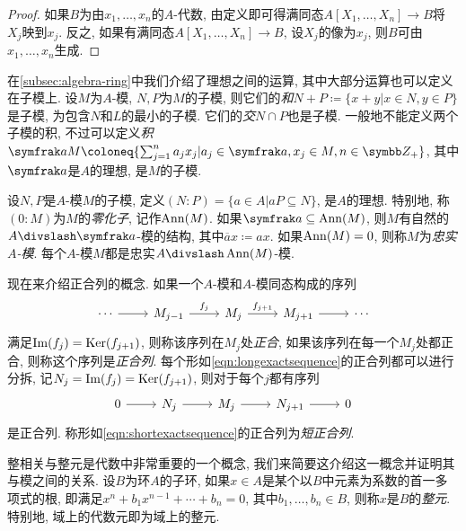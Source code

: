\begin{proof}
  如果$B$为由$x_1, \dotsc, x_n$的$A$-代数, 由定义即可得满同态$A[X_1, \dotsc, X_n]\to B$将$X_j$映到$x_j$. 反之, 如果有满同态$A[X_1, \dotsc, X_n]\to B$, 设$X_j$的像为$x_j$, 则$B$可由$x_1, \dotsc, x_n$生成.
\end{proof}

在\ref{subsec:algebra-ring}中我们介绍了理想之间的运算, 其中大部分运算也可以定义在子模上. 设$M$为$A$-模, $N, P$为$M$的子模, 则它们的\emph{和}$N+P\coloneq \{x+y\vert x\in N, y\in P\}$是子模, 为包含$N$和$L$的最小的子模. 它们的\emph{交}$N\cap P$也是子模. 一般地不能定义两个子模的积, 不过可以定义\emph{积}$\ideal{a}M\coloneq \{\sum_{j=1}^n a_jx_j\vert a_j\in\ideal{a}, x_j\in M, n\in\ZZ_+\}$, 其中$\ideal{a}$是$A$的理想, 是$M$的子模.

设$N, P$是$A$-模$M$的子模, 定义$(N{:}P)=\{a\in A\vert aP\subseteq N\}$, 是$A$的理想. 特别地, 称$(0{:}M)$为$M$的\emph{零化子}, 记作$\operatorname{Ann} (M)$. 如果$\ideal{a}\subseteq \Ann (M)$, 则$M$有自然的$A{\divslash}\ideal{a}$-模的结构, 其中$\overline{a}x\coloneq ax$. 如果$\operatorname{Ann} (M)=0$, 则称$M$为\emph{忠实$A$-模}. 每个$A$-模$M$都是忠实$A{\divslash}\Ann (M)$-模.

现在来介绍正合列的概念. 如果一个$A$-模和$A$-模同态构成的序列
\begin{equation}
  \begin{tikzcd}
    \dotsb \arrow[r] & M_{j-1} \arrow[r, "f_j"] & M_j \arrow[r, "f_{j+1}"] & M_{j+1} \arrow[r] & \dotsb\label{eqn:longexactsequence}
  \end{tikzcd}
\end{equation}
满足$\operatorname{Im} (f_j)=\operatorname{Ker} (f_{j+1})$, 则称该序列在$M_j$处\emph{正合}, 如果该序列在每一个$M_j$处都正合, 则称这个序列是\emph{正合列}. 每个形如\eqref{eqn:longexactsequence}的正合列都可以进行分拆, 记$N_j=\operatorname{Im} (f_j)=\operatorname{Ker} (f_{j+1})$, 则对于每个$j$都有序列
\begin{equation}
  \begin{tikzcd}
    0 \arrow[r] & N_j \arrow[r] & M_j \arrow[r] & N_{j+1} \arrow[r] & 0\label{eqn:shortexactsequence}
  \end{tikzcd}
\end{equation}
是正合列. 称形如\eqref{eqn:shortexactsequence}的正合列为\emph{短正合列}.

整相关与整元是代数中非常重要的一个概念, 我们来简要这介绍这一概念并证明其与模之间的关系. 设$B$为环$A$的子环, 如果$x\in A$是某个以$B$中元素为系数的首一多项式的根, 即满足$x^n+b_1x^{n-1}+\dotsb +b_n=0$, 其中$b_1, \dotsc, b_n\in B$, 则称$x$是$B$的\emph{整元}. 特别地, 域上的代数元即为域上的整元.

